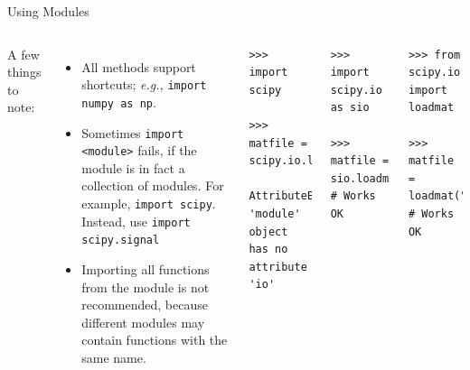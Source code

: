 \documentclass[10pt, aspectratio=169]{beamer} %
\begin{document}
\begin{frame}[fragile,allowframebreaks=0.8]
 {Using Modules}
\begin{columns}%
A few things to note:
\begin{itemize}
	\item All methods support shortcuts; \emph{e.g.,} \verb+import numpy as np+.
	\item Sometimes \verb+import <module>+ fails, if the module is in fact a collection of modules.
	For example, \verb+import scipy+. Instead, use \verb+import scipy.signal+
	\item Importing all functions from the module is not recommended, because different modules
	may contain functions with the same name.
\end{itemize}
\begin{lstlisting}
>>> import scipy

>>> matfile = scipy.io.loadmat("myfile.mat")

AttributeError: 'module' object has no attribute 'io'
\end{lstlisting}
\begin{lstlisting}
>>> import scipy.io as sio

>>> matfile = sio.loadmat("myfile.mat") # Works OK
\end{lstlisting}
\begin{lstlisting}
>>> from scipy.io import loadmat

>>> matfile = loadmat("myfile.mat") # Works OK
\end{lstlisting}

\end{columns}
\end{frame}
\end{document}

